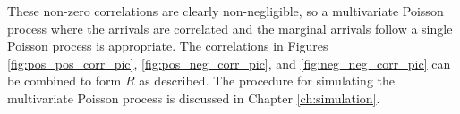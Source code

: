 These non-zero correlations are clearly non-negligible, so a multivariate Poisson process where the arrivals are correlated and the marginal arrivals follow a single Poisson process is appropriate. The correlations in Figures \ref{fig:pos_pos_corr_pic}, \ref{fig:pos_neg_corr_pic}, and \ref{fig:neg_neg_corr_pic} can be combined to form $R$ as described. The procedure for simulating the multivariate Poisson process is discussed in Chapter \ref{ch:simulation}.
